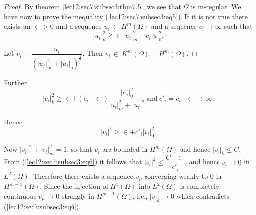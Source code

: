 \begin{proof}%
  By theorem \ref{lec12:sec7:subsec3:thm7.5}, we see that $\Omega$ is m-regular. We have now to
  prove the inequality (\ref{lec12:sec7:subsec3:eq5}). If it is not true there exists an
  $\in > 0$ and a sequence $u_i ~ \in ~ H^m(\Omega)$ and
  a sequence $c_i \rightarrow \infty$ such that 
  $$
  |u_i|^2_k \geqq \in |u_i|^2_m + c_i | u |^2_0.
  $$
  
  Let $v_i = \dfrac{u_i}{(|u_i|^2_m + |u_i|_o)^{\frac{1}{2}}}$. Then
  $v_i ~ \in ~ K^m(\Omega) = H^m(\Omega)$. 
\end{proof}

  Further 
  $$
  |v_i|^2_k \ge \in + (c_i - \in) \dfrac{|u_i|^2_0}{|u_i|^2_m +
    |u_i|^2} ~\text{and}~ c'_i = c_i - \in \rightarrow \infty. 
  $$
  
  Hence  
  \begin{equation}
    |v_i|^2 \ge \in + c'_i |v_i|^2_0.\tag{6}\label{lec12:sec7:subsec3:eq6}
  \end{equation}
  
  Now $|v_i|^2 + |v_i|^2_m = 1$, so that $v_i$ are bounded in
  $H^m(\Omega)$ and hence $|v_i|_k \le C$. From (\ref{lec12:sec7:subsec3:eq6}) it follows that
  $|v_i|^2 \le \dfrac{C - \in }{c'_i}$, and hence $v_i
  \rightarrow 0$ in $L^2(\Omega)$. Therefore there exists a sequence
  $v_\mu$ converging weakly to $0$ in $H^{m-1}(\Omega)$. Since the
  injection of $H^1(\Omega)$ into $L^2(\Omega)$ is completely continuous
  $v_\mu \rightarrow 0$ strongly in $H^{m-1}(\Omega)$, i.e., $|v|_k
  \rightarrow 0$ which contradicts (\ref{lec12:sec7:subsec3:eq6}). 


